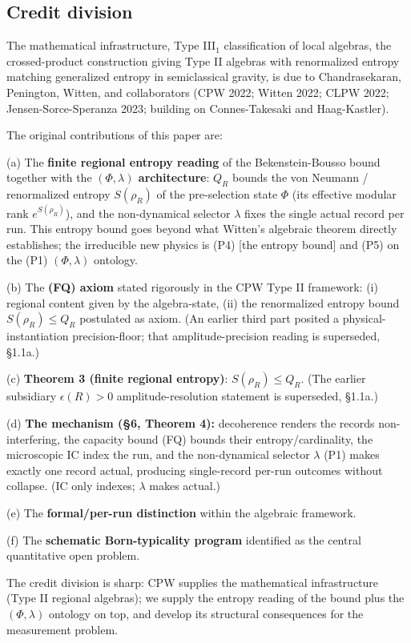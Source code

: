 \documentclass[11pt,a4paper]{article}
\begin{document}
\subsection{Credit division}

The mathematical infrastructure, Type III$_1$ classification of local algebras, the crossed-product construction giving Type II algebras with renormalized entropy matching generalized entropy in semiclassical gravity, is due to Chandrasekaran, Penington, Witten, and collaborators (CPW 2022; Witten 2022; CLPW 2022; Jensen-Sorce-Speranza 2023; building on Connes-Takesaki and Haag-Kastler).

The original contributions of this paper are:

(a) The \textbf{finite regional entropy reading} of the Bekenstein-Bousso bound together with the \textbf{$(\Phi,\lambda)$ architecture}: $Q_R$ bounds the von Neumann / renormalized entropy $S(\rho_R)$ of the pre-selection state $\Phi$ (its effective modular rank $e^{S(\rho_R)}$), and the non-dynamical selector $\lambda$ fixes the single actual record per run. This entropy bound goes beyond what Witten's algebraic theorem directly establishes; the irreducible new physics is (P4) [the entropy bound] and (P5) on the (P1) $(\Phi,\lambda)$ ontology.

(b) The \textbf{(FQ) axiom} stated rigorously in the CPW Type II framework: (i) regional content given by the algebra-state, (ii) the renormalized entropy bound $S(\rho_R) \le Q_R$ postulated as axiom. (An earlier third part posited a physical-instantiation precision-floor; that amplitude-precision reading is superseded, §1.1a.)

(c) \textbf{Theorem 3 (finite regional entropy)}: $S(\rho_R) \le Q_R$. (The earlier subsidiary $\epsilon(R) > 0$ amplitude-resolution statement is superseded, §1.1a.)

(d) \textbf{The mechanism (§6, Theorem 4):} decoherence renders the records non-interfering, the capacity bound (FQ) bounds their entropy/cardinality, the microscopic IC index the run, and the non-dynamical selector $\lambda$ (P1) makes exactly one record actual, producing single-record per-run outcomes without collapse. (IC only indexes; $\lambda$ makes actual.)

(e) The \textbf{formal/per-run distinction} within the algebraic framework.

(f) The \textbf{schematic Born-typicality program} identified as the central quantitative open problem.

The credit division is sharp: CPW supplies the mathematical infrastructure (Type II regional algebras); we supply the entropy reading of the bound plus the $(\Phi,\lambda)$ ontology on top, and develop its structural consequences for the measurement problem.
\end{document}
